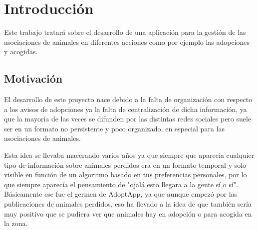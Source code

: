 \documentclass{article}
\renewcommand\maketitle{} %
\begin{document}
	
	

\maketitle

\section{Introducción}

Este trabajo tratará sobre el desarrollo de una aplicación para la gestión de las asociaciones de animales en diferentes acciones como por ejemplo las adopciones y acogidas.

\subsection{Motivación}

El desarrollo de este proyecto nace debido a la falta de organización con respecto a los avisos de adopciones ya la falta de centralización de dicha información, ya que la mayoría de las veces se difunden por las distintas redes sociales pero suele ser en un formato no persistente y poco organizado, en especial para las asociaciones de animales.

Esta idea se llevaba macerando varios años ya que siempre que aparecía cualquier tipo de información sobre animales perdidos era en un formato temporal y solo visible en función de un algoritmo basado en tus preferencias personales, por lo que siempre aparecía el pensamiento de "ojalá esto llegara a la gente sí o sí". Básicamente ese fue el germen de AdoptApp, ya que aunque empezó por las publicaciones de animales perdidos, eso ha llevado a la idea de que también sería muy positivo que se pudiera ver que animales hay en adopción o para acogida en la zona.






\end{document}
